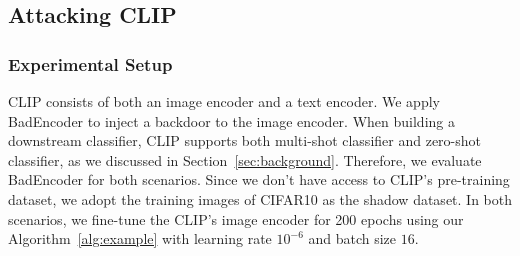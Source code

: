 \begin{table}[tp]\renewcommand{\arraystretch}{1.2} 
	\centering
	\caption{ BadEncoder achieves high attack success rates and maintains the  accuracy of the downstream classifiers when attacking CLIP~\cite{radford2021learning}.}
	

	\label{case_study_clip_st}
	\vspace{-6mm}
\end{table}

\subsection{Attacking CLIP}

\subsubsection{Experimental Setup} CLIP consists of both an image encoder and a text encoder. We apply BadEncoder to inject a backdoor to the image encoder. When building a downstream classifier, CLIP supports both multi-shot classifier and zero-shot classifier, as we discussed in Section~\ref{sec:background}. Therefore, we evaluate BadEncoder for both scenarios. Since we don't have access to CLIP's  pre-training dataset, we  adopt the training images of CIFAR10 as the shadow dataset. In both scenarios, we fine-tune the CLIP's image encoder for 200 epochs using our Algorithm~\ref{alg:example} with learning rate $10^{-6}$ and batch size $16$.  

